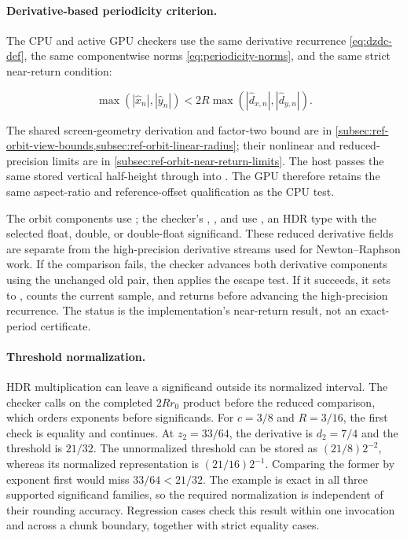\paragraph{Derivative-based periodicity criterion.}

The CPU and active GPU checkers use the same derivative recurrence
\eqref{eq:dzdc-def}, the same componentwise norms
\eqref{eq:periodicity-norms}, and the same strict near-return condition:

\begin{equation}
  \max(|\widehat{x}_n|,|\widehat{y}_n|)
  <2R\max(|\hat d_{x,n}|,|\hat d_{y,n}|).
  \label{eq:periodicity-ineq}
\end{equation}

The shared screen-geometry derivation and factor-two bound are in
\cref{subsec:ref-orbit-view-bounds,subsec:ref-orbit-linear-radius}; their
nonlinear and reduced-precision limits are in
\cref{subsec:ref-orbit-near-return-limits}. The host passes the same stored
vertical half-height through  into .
The GPU therefore retains the same aspect-ratio and reference-offset
qualification as the CPU test.

The orbit components use ; the checker's ,
, and  use
, an HDR type with the selected float, double,
or double-float significand. These reduced derivative fields are separate
from the high-precision derivative streams used for Newton--Raphson work.
If the comparison fails, the checker advances both derivative components
using the unchanged old pair, then applies the escape test. If it succeeds,
it sets  to , counts the current
sample, and returns before advancing the high-precision recurrence.
The status is the implementation's near-return result, not an exact-period
certificate.

\paragraph{Threshold normalization.}
HDR multiplication can leave a significand outside its normalized interval.
The checker calls  on the completed $2Rr_0$ product before
the reduced comparison, which orders exponents before significands.
For $c=3/8$ and $R=3/16$, the first check is equality and continues. At
$z_2=33/64$, the derivative is $d_2=7/4$ and the threshold is $21/32$.
The unnormalized threshold can be stored as $(21/8)2^{-2}$, whereas its
normalized representation is $(21/16)2^{-1}$. Comparing the former by
exponent first would miss $33/64<21/32$. The example is exact in all three
supported significand families, so the required normalization is independent
of their rounding accuracy. Regression cases check this result within one
invocation and across a chunk boundary, together with strict equality cases.

